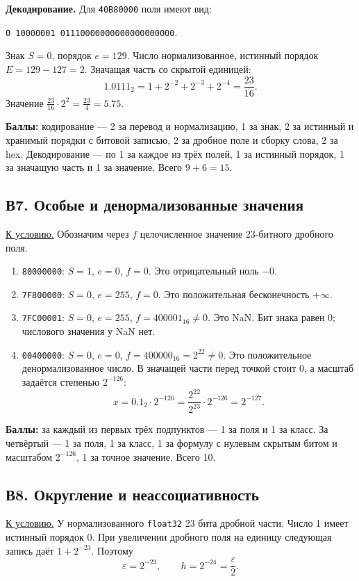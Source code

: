\textbf{Декодирование.} Для \texttt{40B80000} поля имеют вид:
\begin{center}
\texttt{0 10000001 01110000000000000000000}.
\end{center}
Знак $S=0$, порядок $e=129$. Число нормализованное, истинный порядок $E=129-127=2$. Значащая часть со скрытой единицей:
\[
1.0111_2=1+2^{-2}+2^{-3}+2^{-4}=\frac{23}{16}.
\]
Значение $\frac{23}{16}\cdot2^2=\frac{23}{4}=5.75$.

\textbf{Баллы:} кодирование --- 2 за перевод и нормализацию, 1 за знак, 2 за истинный и хранимый порядки с битовой записью, 2 за дробное поле и сборку слова, 2 за hex. Декодирование --- по 1 за каждое из трёх полей, 1 за истинный порядок, 1 за значащую часть и 1 за значение. Всего $9+6=15$.

\subsection*{В7. Особые и денормализованные значения}\label{sol:v7}
\hyperref[task:v7]{К условию.}
Обозначим через $f$ целочисленное значение 23-битного дробного поля.
\begin{enumerate}
    \item \texttt{80000000}: $S=1$, $e=0$, $f=0$. Это отрицательный ноль $-0$.
    \item \texttt{7F800000}: $S=0$, $e=255$, $f=0$. Это положительная бесконечность $+\infty$.
    \item \texttt{7FC00001}: $S=0$, $e=255$, $f=400001_{16}\ne0$. Это NaN. Бит знака равен 0; числового значения у NaN нет.
    \item \texttt{00400000}: $S=0$, $e=0$, $f=400000_{16}=2^{22}\ne0$. Это положительное денормализованное число. В значащей части перед точкой стоит 0, а масштаб задаётся степенью $2^{-126}$:
    \[
    x=0.1_2\cdot2^{-126}
      =\frac{2^{22}}{2^{23}}\cdot2^{-126}=2^{-127}.
    \]
\end{enumerate}
\textbf{Баллы:} за каждый из первых трёх подпунктов --- 1 за поля и 1 за класс. За четвёртый --- 1 за поля, 1 за класс, 1 за формулу с нулевым скрытым битом и масштабом $2^{-126}$, 1 за точное значение. Всего 10.

\subsection*{В8. Округление и неассоциативность}\label{sol:v8}
\hyperref[task:v8]{К условию.}
У нормализованного \texttt{float32} 23 бита дробной части. Число 1 имеет истинный порядок 0. При увеличении дробного поля на единицу следующая запись даёт $1+2^{-23}$. Поэтому
\[
\varepsilon=2^{-23},\qquad h=2^{-24}=\frac{\varepsilon}{2}.
\]

